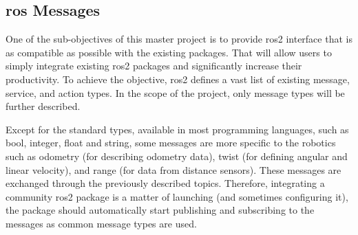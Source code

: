 

\subsection{\ac{ros} Messages}
One of the sub-objectives of this master project is to provide \ac{ros2} interface that is as compatible as possible with the existing packages.
That will allow users to simply integrate existing \ac{ros2} packages and significantly increase their productivity.
To achieve the objective, \ac{ros2} defines a vast list of existing message, service, and action types.
In the scope of the project, only message types will be further described.

Except for the standard types, available in most programming languages, such as bool, integer, float and string, some messages are more specific to the robotics such as odometry (for describing odometry data), twist (for defining angular and linear velocity), and range (for data from distance sensors).
These messages are exchanged through the previously described topics.
Therefore, integrating a community \ac{ros2} package is a matter of launching (and sometimes configuring it), the package should automatically start publishing and subscribing to the messages as common message types are used.

